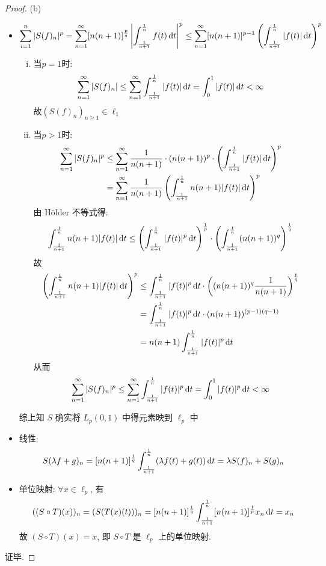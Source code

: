 \begin{proof}
(b)\begin{itemize}
\item \[\sum_{i=1}^n|S(f)_n|^p=\sum_{n=1}^{\infty}[n(n+1)]^{\frac{p}{q}}\left|\int_{\frac{1}{n+1}}^{\frac{1}{n}}f(t)\mathop{}\!\mathrm{d} t\right|^p\leq\sum_{n=1}^{\infty}[n(n+1)]^{p-1}\left(\int_{\frac{1}{n+1}}^{\frac{1}{n}}|f(t)|\mathop{}\!\mathrm{d} t\right)^p\]
\begin{enumerate}[(i)]
\item 当$p=1$时:
\[\sum_{n=1}^{\infty}|S(f)_n|\leq\sum_{n=1}^{\infty}\int_{\frac{1}{n+1}}^{\frac{1}{n}}|f(t)|\mathop{}\!\mathrm{d} t=\int_0^1|f(t)|\mathop{}\!\mathrm{d} t<\infty\]
故$(S(f)_n)_{n\geq 1}\in\ell_1$
\item 当$p>1$时:
\[\begin{split}\sum_{n=1}^{\infty}|S(f)_n|^p&\leq\sum_{n=1}^{\infty}\frac{1}{n(n+1)}\cdot (n(n+1))^p\cdot\left(\int_{\frac{1}{n+1}}^{\frac{1}{n}}|f(t)|\mathop{}\!\mathrm{d} t\right)^p\\&=\sum_{n=1}^{\infty}\frac{1}{n(n+1)}\left(\int_{\frac{1}{n+1}}^{\frac{1}{n}}n(n+1)|f(t)|\mathop{}\!\mathrm{d} t\right)^p\end{split}\]
由 H\"older 不等式得:
\[\int_{\frac{1}{n+1}}^{\frac{1}{n}}n(n+1)|f(t)|\mathop{}\!\mathrm{d} t\leq\left(\int_{\frac{1}{n+1}}^{\frac{1}{n}}|f(t)|^p\mathop{}\!\mathrm{d} t\right)^{\frac{1}{p}}\cdot\left(\int_{\frac{1}{n+1}}^{\frac{1}{n}}(n(n+1))^q\right)^{\frac{1}{q}}\]
故\[\begin{split}
\left(\int_{\frac{1}{n+1}}^{\frac{1}{n}}n(n+1)|f(t)|\mathop{}\!\mathrm{d} t\right)^p
&\leq\int_{\frac{1}{n+1}}^{\frac{1}{n}}|f(t)|^p\mathop{}\!\mathrm{d} t\cdot\left((n(n+1))^q\frac{1}{n(n+1)}\right)^{\frac{p}{q}}\\
&=\int_{\frac{1}{n+1}}^{\frac{1}{n}}|f(t)|^p\mathop{}\!\mathrm{d} t\cdot(n(n+1))^{(p-1)(q-1)}\\
&=n(n+1)\int_{\frac{1}{n+1}}^{\frac{1}{n}}|f(t)|^p\mathop{}\!\mathrm{d} t
\end{split}\]
从而
\[\sum_{n=1}^{\infty}|S(f)_n|^p\leq\sum_{n=1}^{\infty}\int_{\frac{1}{n+1}}^{\frac{1}{n}}|f(t)|^p\mathop{}\!\mathrm{d} t=\int_0^1|f(t)|^p\mathop{}\!\mathrm{d} t<\infty\]
\end{enumerate}
综上知 $S$ 确实将 $L_p(0,1)$ 中得元素映到 $\ell_p$ 中
\item 线性:
\[S(\lambda f+g)_n=[n(n+1)]^{\frac{1}{q}}\int_{\frac{1}{n+1}}^{\frac{1}{n}}(\lambda f(t)+g(t))\mathop{}\!\mathrm{d} t=\lambda S(f)_n+S(g)_n\]
\item 单位映射: $\forall x\in\ell_p$, 有
\[((S\circ T)(x))_n=(S(T(x)(t)))_n=[n(n+1)]^{\frac{1}{q}}\int_{\frac{1}{n+1}}^{\frac{1}{n}}[n(n+1)]^{\frac{1}{p}}x_n\mathop{}\!\mathrm{d} t=x_n\]
故 $(S\circ T)(x)=x$, 即 $S\circ T$ 是 $\ell_p$ 上的单位映射.
\end{itemize}
证毕.
\end{proof}




